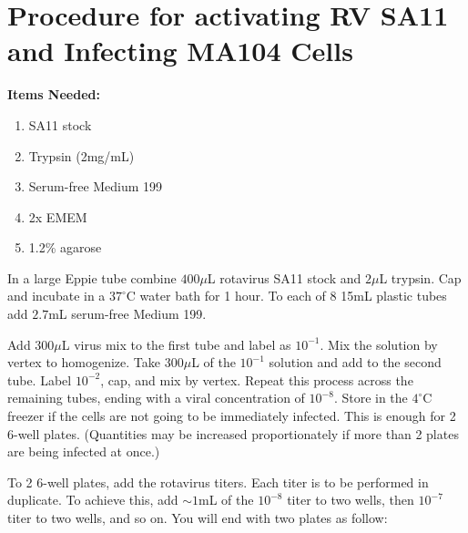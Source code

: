 \section{Procedure for activating RV SA11 and Infecting MA104 Cells}

{\bfseries Items Needed:} \begin{enumerate}
	\item SA11 stock
	\item Trypsin (2mg/mL)
	\item Serum-free Medium 199
	\item 2x EMEM
	\item 1.2\% agarose
\end{enumerate}

In a large Eppie tube combine $400\mu$L rotavirus SA11 stock and $2\mu$L trypsin. Cap and incubate in a $37^{\circ}$C water bath for 1 hour. To each of 8 15mL plastic tubes add $2.7$mL serum-free Medium 199.

Add $300\mu$L virus mix to the first tube and label as $10^{-1}$. Mix the solution by vertex to homogenize. Take $300\mu$L of the $10^{-1}$ solution and add to the second tube. Label $10^{-2}$, cap, and mix by vertex. Repeat this process across the remaining tubes, ending with a viral concentration of $10^{-8}$. Store in the $4^{\circ}$C freezer if the cells are not going to be immediately infected. This is enough for 2 6-well plates. (Quantities may be increased proportionately if more than 2 plates are being infected at once.)

To 2 6-well plates, add the rotavirus titers. Each titer is to be performed in duplicate. To achieve this, add $\sim 1$mL of the $10^{-8}$ titer to two wells, then $10^{-7}$ titer to two wells, and so on. You will end with two plates as follow:

